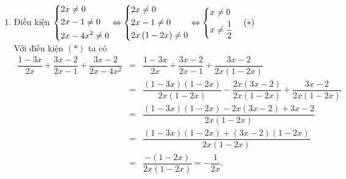 \begin{bt}
{\begin{enumerate}
\begin{eqnarray*}
		\end{eqnarray*}
	\item Điều kiện $\left\{\begin{aligned}&2x\neq 0 \\ & 2x - 1\neq 0\\&2x -4x^2\neq 0\end{aligned}\right.\Leftrightarrow\left\{\begin{aligned}&2x\neq 0 \\ & 2x - 1\neq 0\\&2x\left(1 - 2x\right)\neq 0\end{aligned}\right.\Leftrightarrow\left\{\begin{aligned}&x\neq 0 \\ &x\neq\dfrac{1}{2}\end{aligned}\right.\quad (*)$\\
	Với điều kiện $(*)$ ta có
	\begin{eqnarray*}
	\dfrac{1 - 3x}{2x} + \dfrac{3x - 2}{2x - 1} + \dfrac{3x - 2}{2x - 4x^2} &=&\dfrac{1 - 3x}{2x} + \dfrac{3x - 2}{2x - 1} + \dfrac{3x - 2}{2x\left(1 - 2x\right)}\\
		&=&\dfrac{\left(1 - 3x\right)\left(1 - 2x\right)}{2x\left(1 - 2x\right)} - \dfrac{2x\left(3x - 2\right)}{2x\left(1 - 2x\right)} + \dfrac{3x - 2}{2x\left(1 - 2x\right)}\\
		&=&\dfrac{\left(1 - 3x\right)\left(1 - 2x\right) - 2x\left(3x - 2\right) + 3x - 2}{2x\left(1 - 2x\right)}\\
		&=&\dfrac{\left(1 - 3x\right)\left(1 - 2x\right) + \left(3x - 2\right)\left(1 - 2x\right)}{2x\left(1 - 2x\right)}\\
		&=&\dfrac{-\left(1 - 2x\right)}{2x\left(1 - 2x\right)} = - \dfrac{1}{2x}.
			\end{eqnarray*}
	\end{enumerate}
	}
\end{bt}
